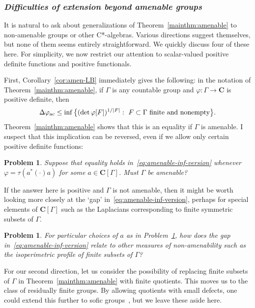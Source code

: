 \documentclass[12pt,a4paper]{article}
\numberwithin{equation}{section}
\newtheorem{prob}[thm]{Problem}
\theoremstyle{remark}
\renewcommand{\rm}[1]{\mathrm{#1}}
\newcommand{\bbC}{\mathbf{C}}
\newcommand{\G}{\Gamma}
\renewcommand{\phi}{\varphi}
\begin{document}
\subsubsection*{\emph{Difficulties of extension beyond amenable groups}}

It is natural to ask about generalizations of Theorem~\ref{mainthm:amenable} to non-amenable groups or other C*-algebras.  Various directions suggest themselves, but none of them seems entirely straightforward.  We quickly discuss four of these here.  For simplicity, we now restrict our attention to scalar-valued positive definite functions and positive functionals.

First, Corollary~\ref{cor:amen-LB} immediately gives the following: in the notation of Theorem~\ref{mainthm:amenable}, if $\G$ is any countable group and $\phi:\G\to \bbC$ is positive definite, then
\begin{equation}\label{eq:amenable-inf-version}
\Delta \phi_{\rm{ac}} \le \inf\big\{(\det \phi[F])^{1/|F|}:\ F \subset \G\ \hbox{finite and nonempty}\big\}.
\end{equation}
Theorem~\ref{mainthm:amenable} shows that this is an equality if $\G$ is amenable.  I suspect that this implication can be reversed, even if we allow only certain positive definite functions:

\begin{prob}\label{prob:characterize-amenable}
Suppose that equality holds in~\eqref{eq:amenable-inf-version} whenever $\phi = \tau(a^\ast (\cdot)a)$ for some $a \in \bbC[\G]$.  Must $\G$ be amenable?
\end{prob}

If the answer here is positive and $\G$ is not amenable, then it might be worth looking more closely at the `gap' in~\eqref{eq:amenable-inf-version}, perhaps for special elements of $\bbC[\G]$ such as the Laplacians corresponding to finite symmetric subsets of $\G$.

\begin{prob}
For particular choices of $a$ as in Problem~\ref{prob:characterize-amenable}, how does the gap in~\eqref{eq:amenable-inf-version} relate to other measures of non-amenability such as the isoperimetric profile of finite subsets of $\G$?
\end{prob}

For our second direction, let us consider the possibility of replacing finite subsets of $\G$ in Theorem~\ref{mainthm:amenable} with finite quotients.  This moves us to the class of residually finite groups.  By allowing quotients with small defects, one could extend this further to sofic groups~\cite{KwiPes13}, but we leave these aside here.
\end{document}
